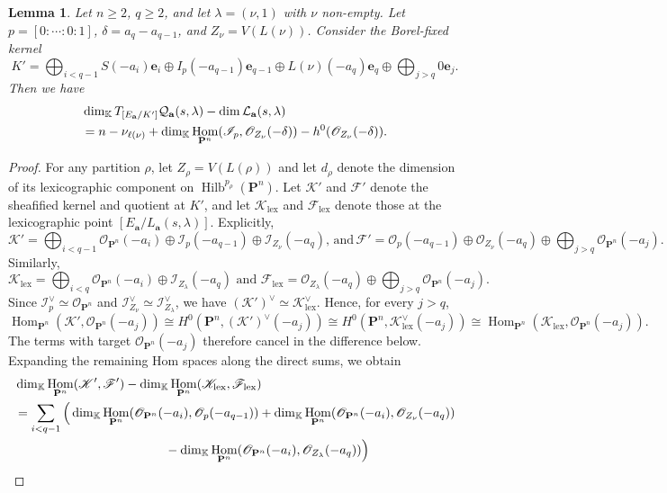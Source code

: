 \documentclass[leqno,11pt,a4paper]{amsart}
\newtheorem{lemma}[lemma]{Lemma}
\theoremstyle{definition}
\numberwithin{equation}{section}
\newcommand{\kk}{\mathbb{K}}
\newcommand{\bfa}{\mathbf{a}}
\newcommand{\lex}{\mathrm{lex}}
\newcommand{\PP}{\mathbf{P}}
\newcommand{\bfe}{\mathbf{e}}
\newcommand{\FF}{\mathscr{F}}
\newcommand{\OO}{\mathscr{O}}
\newcommand{\II}{\mathscr{I}}
\newcommand{\KK}{\mathscr{K}}
\newcommand{\LL}{\mathcal{L}}
\newcommand{\QQ}{\mathcal{Q}}
\DeclareMathOperator{\Hom}{Hom}
\DeclareMathOperator{\Hilb}{Hilb}
\begin{document}
\begin{lemma} \label{tan_excess}
Let $n\geq2$, $q\geq2$, and let $\lambda=(\nu,1)$ with $\nu$ non-empty. 
Let $p=[0:\cdots:0:1]$, $\delta=a_q-a_{q-1}$, and $Z_\nu=V(L(\nu))$.
Consider the Borel-fixed kernel
$$
K'=\bigoplus_{i<q-1}S(-a_i)\bfe_i \oplus I_p(-a_{q-1})\bfe_{q-1} \oplus L(\nu)(-a_q)\bfe_q \oplus\bigoplus_{j>q}0\bfe_j.
$$
Then we have 
\begin{align}\label{eq_tan_ex}
&\dim_\kk T_{[E_{\bfa}/K']}\QQ_{\bfa}(s,\lambda)
-\dim\LL_{\bfa}(s,\lambda) \notag\\
&=n-\nu_{\ell(\nu)}
+\dim_\kk\Hom_{\PP^n}(\II_p,\OO_{Z_\nu}(-\delta)) - h^0(\OO_{Z_\nu}(-\delta)).
\end{align}
\end{lemma}
\begin{proof}
For any partition $\rho$, let $Z_\rho=V(L(\rho))$ and let $d_\rho$ denote the dimension of its lexicographic component on $\Hilb^{p_\rho}(\PP^n)$.
Let $\KK'$ and $\FF'$ denote the sheafified kernel and quotient at $K'$, and let
$\KK_{\lex}$ and $\FF_{\lex}$
denote those at the lexicographic point $[E_{\bfa}/L_{\bfa}(s,\lambda)]$. 
Explicitly,
$$
\mathscr K'= \bigoplus_{i<q-1}\OO_{\PP^n}(-a_i) \oplus\II_p(-a_{q-1}) \oplus\II_{Z_\nu}(-a_q), \, \text{and} \,
\mathscr F' = \OO_p(-a_{q-1}) \oplus\OO_{Z_\nu}(-a_q) \oplus\bigoplus_{j>q}\OO_{\PP^n}(-a_j).
$$
Similarly,
$$
\KK_{\lex}  = \bigoplus_{i<q}\OO_{\PP^n}(-a_i) \oplus\II_{Z_\lambda}(-a_q) \,\, \text{and} \, \, 
\mathscr F_{\lex} = \OO_{Z_\lambda}(-a_q) \oplus\bigoplus_{j>q}\OO_{\PP^n}(-a_j).
$$
Since $\II_p^\vee\simeq\OO_{\PP^n}$ and $\II_{Z_\nu}^\vee\simeq\II_{Z_\lambda}^\vee$, we have $(\KK')^\vee\simeq\KK_{\lex}^\vee$. 
Hence, for every $j>q$,
$$
\Hom_{\PP^n}(\KK',\OO_{\PP^n}(-a_j)) \cong H^0(\PP^n,(\mathscr K')^\vee(-a_j))
\cong H^0(\PP^n,\mathscr K_{\lex}^\vee(-a_j)) \cong \Hom_{\PP^n}(\KK_{\lex},\OO_{\PP^n}(-a_j)).
$$
The terms with target $\OO_{\PP^n}(-a_j)$ therefore cancel in the difference below. 
Expanding the remaining Hom spaces along the direct sums, we obtain
\begin{align*}
&\dim_\kk\Hom_{\PP^n}(\KK',\FF') -\dim_\kk\Hom_{\PP^n}(\KK_{\lex}, \FF_{\lex})\\
&=\sum_{i<q-1}\Big(
\dim_\kk\Hom_{\PP^n}(\OO_{\PP^n}(-a_i),\OO_p(-a_{q-1}))
+\dim_\kk\Hom_{\PP^n}(\OO_{\PP^n}(-a_i),\OO_{Z_\nu}(-a_q))\\
&\hspace{42mm}
-\dim_\kk\Hom_{\PP^n}(\OO_{\PP^n}(-a_i),\OO_{Z_\lambda}(-a_q))
\Big)\\

\end{align*}
\end{proof}
\end{document}
